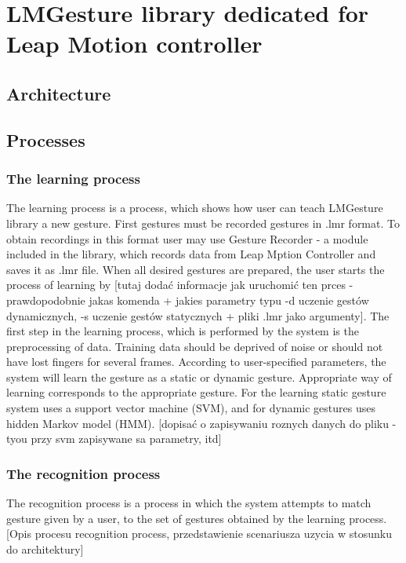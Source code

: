 \chapter{LMGesture library dedicated for Leap Motion controller}

\section{Architecture}

\section{Processes}

\subsection{The learning process}
The learning process is a process, which shows how user can teach LMGesture library a new gesture. First  gestures must be recorded gestures in .lmr format. To obtain recordings in this format user may use Gesture Recorder -  a module included in the library, which records data from Leap Mption Controller and saves it as .lmr file. When all desired gestures are prepared, the user starts the process of learning by {\color{red}[tutaj dodać informacje jak uruchomić ten prces - prawdopodobnie jakas komenda + jakies parametry typu -d uczenie gestów dynamicznych, -s uczenie gestów statycznych + pliki .lmr jako argumenty]}. 
The first step in the learning process, which is performed by the system is the preprocessing of data. Training data should be deprived of noise or should not have lost fingers for several frames. According to user-specified parameters, the system will learn the gesture as a static or dynamic gesture. Appropriate way of learning corresponds to the appropriate gesture.
For the learning static gesture system uses a support vector machine (SVM), and for dynamic gestures uses hidden Markov model (HMM). {\color{red}[dopisać o zapisywaniu roznych danych do pliku - tyou przy svm zapisywane sa parametry, itd]}

\subsection{The recognition process}
The recognition process is a process in which the system attempts to match gesture given by a user, to the set of gestures obtained by the learning process. {\color{red}[Opis procesu recognition process, przedstawienie scenariusza uzycia w stosunku do architektury]}

